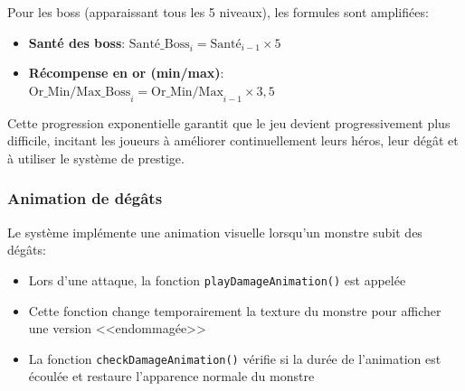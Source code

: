 \documentclass[11pt,a4paper]{article}
\begin{document}
Pour les boss (apparaissant tous les 5 niveaux), les formules sont amplifiées:
\begin{itemize}
    \item \textbf{Santé des boss}: $\text{Santé\_Boss}_i = \text{Santé}_{i-1} \times 5$
    \item \textbf{Récompense en or (min/max)}:\\ $\text{Or\_Min/Max\_Boss}_i = \text{Or\_Min/Max}_{i-1} \times 3,5$
\end{itemize}

Cette progression exponentielle garantit que le jeu devient progressivement plus difficile, incitant les joueurs à améliorer continuellement leurs héros, leur dégât et à utiliser le système de prestige.

\subsubsection{Animation de dégâts}
Le système implémente une animation visuelle lorsqu'un monstre subit des dégâts:
\begin{itemize}
    \item Lors d'une attaque, la fonction \texttt{playDamageAnimation()} est appelée
    \item Cette fonction change temporairement la texture du monstre pour afficher une version <<endommagée>>
    \item La fonction \texttt{checkDamageAnimation()} vérifie si la durée de l'animation est écoulée et restaure l'apparence normale du monstre
\end{itemize}
\end{document}
